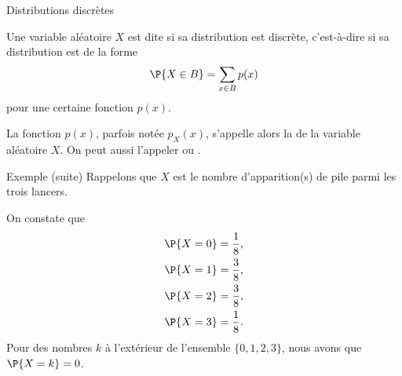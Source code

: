 \documentclass[nuit,charter,pied]{BeamerJS}
\begin{document}
\begin{frame}{Distributions discrètes}
	\begin{defn}{}
		Une variable aléatoire $X$ est dite  si sa distribution est discrète, c'est-à-dire si sa distribution est de la forme
		\[\P{X\in B}=\sum_{x\in B}p(x)\]
		pour une certaine fonction $p(x)$.
	\end{defn}
	\pause
	\begin{rem}
	La fonction $p(x)$, parfois notée $p_X(x)$, s'appelle alors la  de la variable aléatoire $X$. On peut aussi l'appeler  ou .
	\end{rem}
\end{frame}
%
%        
%
%
%
\begin{frame}{Exemple (suite)}
	Rappelons que $X$ est le nombre d'apparition(s) de pile parmi les trois lancers.\pause
	
	On constate que
	\begin{align*}
		\P{X=0}&=\frac{1}{8},\\
		\P{X=1}&=\frac{3}{8},\\
		\P{X=2}&=\frac{3}{8},\\
		\P{X=3}&=\frac{1}{8}.
	\end{align*}\pause
	Pour des nombres $k$ à l'extérieur de l'ensemble $\{0,1,2,3\}$, nous avons que $\P{X=k}=0$.
\end{frame}
\end{document}
